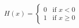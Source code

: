 \documentclass[preview]{standalone}
\begin{document}
\begin{align*}
H(x) = \begin{cases} 0 & \text{if } x < 0 \\ 1 & \text{if } x \geq 0 \end{cases}
\end{align*}
\end{document}

